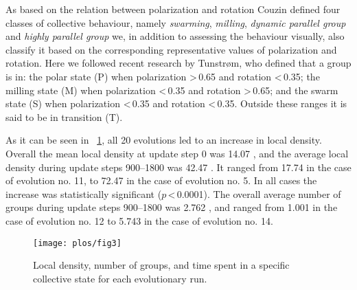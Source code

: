 As based on the relation between polarization and rotation Couzin\etal \cite{couzin2002collective} defined four classes of collective behaviour, namely \emph{swarming}, \emph{milling}, \emph{dynamic parallel group} and \emph{highly parallel group} we, in addition to assessing the behaviour visually, also classify it based on the corresponding representative values of polarization and rotation. Here we followed recent research by Tunstrøm\etal \cite{tunstrom2013collective}, who defined that a group is in: the polar state (P) when polarization \textgreater\,\num{0.65} and rotation \textless\,\num{0.35}; the milling state (M) when polarization \textless\,\num{0.35} and rotation \textgreater\,\num{0.65}; and the swarm state (S) when polarization \textless\,\num{0.35} and rotation \textless\,\num{0.35}. Outside these ranges it is said to be in transition (T).

As it can be seen in \figurename~\ref{fig3}, all 20 evolutions led to an increase in local density. Overall the mean local density at update step 0 was \num{14.07} , and the average local density during update steps \numrange{900}{1800} was \num{42.47} . It ranged from \num{17.74}  in the case of evolution no. 11, to \num{72.47}  in the case of evolution no. 5. In all cases the increase was statistically significant ($p$\,\textless\,\num{0.0001}). The overall average number of groups during update steps \numrange{900}{1800} was \num{2.762} , and ranged from \num{1.001}  in the case of evolution no. 12 to \num{5.743}  in the case of evolution no. 14.

\begin{figure}
  \texttt{[image: plos/fig3]}
  \caption{Local density, number of groups, and time spent in a specific collective state for each evolutionary run.}
  \label{fig3}
\end{figure}


